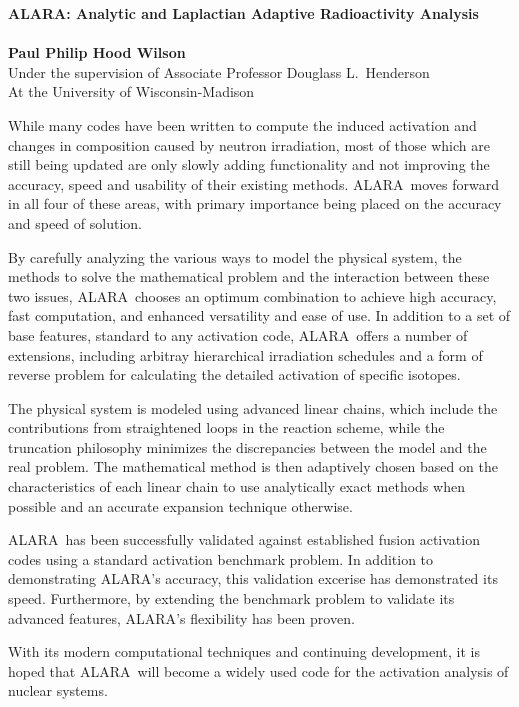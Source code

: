 \documentclass[12pt,dvips]{article}
\def\ALARA{\textsf{ALARA}}
\begin{document}
\begin{center}
  \textbf{\large ALARA: Analytic and Laplactian Adaptive Radioactivity
    Analysis}\\
  \ \\
  \textbf{Paul Philip Hood Wilson}\\
  Under the supervision of Associate Professor Douglass L.~Henderson\\
  At the University of Wisconsin-Madison
\end{center}


  While many codes have been written to compute the induced activation
  and changes in composition caused by neutron irradiation, most of
  those which are still being updated are only slowly adding
  functionality and not improving the accuracy, speed and usability of
  their existing methods.  \ALARA\ moves forward in all four of these
  areas, with primary importance being placed on the accuracy and
  speed of solution.
  
  By carefully analyzing the various ways to model the physical
  system, the methods to solve the mathematical problem and the
  interaction between these two issues, \ALARA\ chooses an optimum
  combination to achieve high accuracy, fast computation, and enhanced
  versatility and ease of use.  In addition to a set of base features,
  standard to any activation code, \ALARA\ offers a number of
  extensions, including arbitray hierarchical irradiation schedules
  and a form of reverse problem for calculating the detailed
  activation of specific isotopes.
  
  The physical system is modeled using advanced linear chains, which
  include the contributions from straightened loops in the reaction
  scheme, while the truncation philosophy minimizes the discrepancies
  between the model and the real problem.  The mathematical method is
  then adaptively chosen based on the characteristics of each linear
  chain to use analytically exact methods when possible and an
  accurate expansion technique otherwise.
  
  \ALARA\ has been successfully validated against established fusion
  activation codes using a standard activation benchmark problem.  In
  addition to demonstrating \ALARA's accuracy, this validation
  excerise has demonstrated its speed.  Furthermore, by extending the
  benchmark problem to validate its advanced features, \ALARA's
  flexibility has been proven.
  
  With its modern computational techniques and continuing development,
  it is hoped that \ALARA\ will become a widely used code for the
  activation analysis of nuclear systems.
\end{document}

